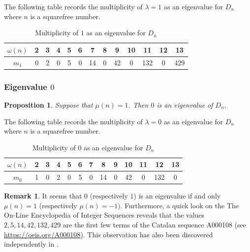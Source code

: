 \documentclass[11pt,a4paper]{amsart}
\newtheorem{prop}[thm]{Proposition}
\theoremstyle{definition}
\newtheorem{rem}[thm]{Remark}
\numberwithin{equation}{section}
\begin{document}
 The following table records the multiplicity of $\lambda=1$ as an eigenvalue for $D_n$ where $n$ is a squarefree number. 

 \begin{table}[h]
\centering
\begin{tabular}{|c|c|c|c|c|c|c|c|c|c|c|c|c|}
\hline
$\omega(n)$ & 2 & 3 & 4 & 5 & 6 & 7 & 8 & 9 & 10 & 11 & 12 & 13 \\
\hline
$m_{1}$ &0 & 2 & 0 & 5 & 0 & 14 & 0 & 42 & 0 & 132 & 0 & 429 \\
\hline
\end{tabular}
\caption{Multiplicity of $1$ as an eigenvalue for $D_n$}
\end{table}

\subsubsection{Eigenvalue $0$}
\begin{prop}
    Suppose that $\mu(n)=1$. Then $0$ is an eigenvalue of $D_n.$
 \end{prop}
 The following table records the multiplicity of $\lambda=0$ as an eigenvalue for $D_n$ where $n$ is a squarefree number. 
 \begin{table}[h]
\begin{tabular}{|c|c|c|c|c|c|c|c|c|c|c|c|c|}
\hline
$\omega(n)$ &2 & 3 & 4 & 5 & 6 & 7 & 8 & 9 & 10 & 11 & 12 & 13 \\
\hline
$m_{0}$ &1 & 0 & 2 & 0 & 5 & 0 & 14 & 0 & 42 & 0 & 132 & 0 \\
\hline
\end{tabular}
\caption{Multiplicity of $0$ as an eigenvalue for $D_n$}
 \end{table}
\begin{rem}
It seems that $0$ (respectively $1$) is an eigenvalue if and only $\mu(n)=1$ (respectively $\mu(n)=-1)$. Furthermore, a quick look on the The On-Line Encyclopedia of Integer Sequences reveals that the values  $2, 5, 14, 42, 132, 429$ are the first few terms of the Catalan sequence A000108 (see \url{https://oeis.org/A000108}). This observation has also been discovered independently in \cite{Catalan}. 

\end{rem}
\end{document}
